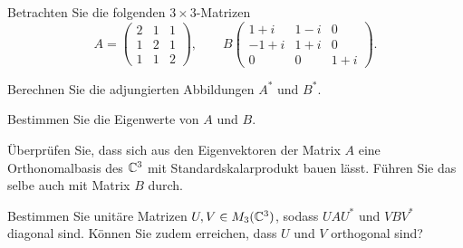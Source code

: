 \begin{Problem}
	Betrachten Sie die folgenden $3\times 3$-Matrizen
	\[
		A=\begin{pmatrix} 2 & 1 & 1 \\ 1 & 2 & 1 \\ 1 & 1 & 2 \end{pmatrix} ,\qquad B\begin{pmatrix} 1+i & 1 - i & 0 \\ -1 + i & 1 + i & 0 \\ 0 & 0 & 1+i \end{pmatrix} 
	.\] 
	\begin{parts}
		\item Berechnen Sie die adjungierten Abbildungen $A^*$ und $B^*$.
		\item Bestimmen Sie die Eigenwerte von $A$ und $B$.
		\item Überprüfen Sie, dass sich aus den Eigenvektoren der Matrix $A$ eine Orthonomalbasis des $\mathbb{C}^3$ mit Standardskalarprodukt bauen lässt. Führen Sie das selbe auch mit Matrix $B$ durch.
		\item Bestimmen Sie unitäre Matrizen $U,V\in M_3(\mathbb{C}^3)$, sodass $UAU^*$ und $VBV^*$ diagonal sind. Können Sie zudem erreichen, dass $U$ und $V$ orthogonal sind?
	\end{parts}
\end{Problem}
